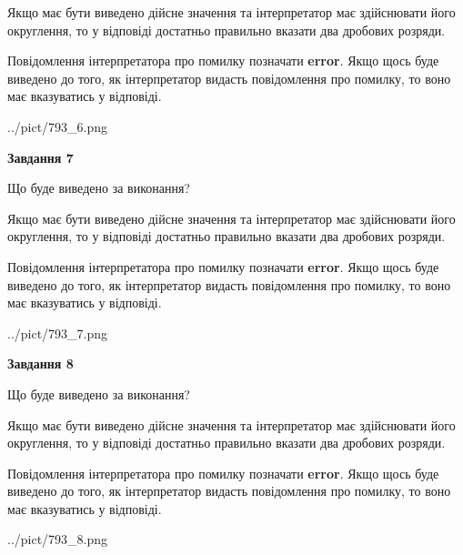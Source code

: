 \documentclass[12pt, ukrainian]{article}
\begin{document}
{\begin {Large}
Якщо має бути виведено дійсне значення та інтерпретатор має здійснювати його округлення, 
то у відповіді достатньо правильно вказати два дробових розряди.

Повідомлення інтерпретатора про помилку позначати \textbf{error}.
Якщо щось буде виведено до того, як інтерпретатор видасть повідомлення про помилку, 
то воно має вказуватись у відповіді. \par

\begin{center}
	{../pict/793_6.png}
\end{center}
\newpage

{\begin {center}\textbf{Завдання 7}\end {center}}\par
Що буде виведено за виконання? \par

Якщо має бути виведено дійсне значення та інтерпретатор має здійснювати його округлення, 
то у відповіді достатньо правильно вказати два дробових розряди.

Повідомлення інтерпретатора про помилку позначати \textbf{error}.
Якщо щось буде виведено до того, як інтерпретатор видасть повідомлення про помилку, 
то воно має вказуватись у відповіді. \par

\begin{center}
	{../pict/793_7.png}
\end{center}
\newpage

{\begin {center}\textbf{Завдання 8}\end {center}}\par
Що буде виведено за виконання? \par

Якщо має бути виведено дійсне значення та інтерпретатор має здійснювати його округлення, 
то у відповіді достатньо правильно вказати два дробових розряди.

Повідомлення інтерпретатора про помилку позначати \textbf{error}.
Якщо щось буде виведено до того, як інтерпретатор видасть повідомлення про помилку, 
то воно має вказуватись у відповіді. \par

\begin{center}
	{../pict/793_8.png}
\end{center}
\newpage


\end{Large}}
\end{document}
